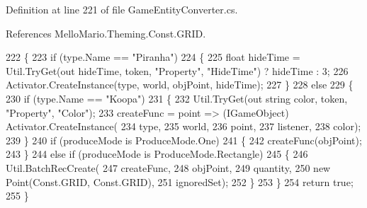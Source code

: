 Definition at line 221 of file Game\+Entity\+Converter.\+cs.



References Mello\+Mario.\+Theming.\+Const.\+G\+R\+ID.


\begin{DoxyCode}
222         \{
223             \textcolor{keywordflow}{if} (type.Name == \textcolor{stringliteral}{"Piranha"})
224             \{
225                 \textcolor{keywordtype}{float} hideTime = Util.TryGet(out hideTime, token, \textcolor{stringliteral}{"Property"}, \textcolor{stringliteral}{"HideTime"}) ? hideTime : 3;
226                 Activator.CreateInstance(type, world, objPoint, hideTime);
227             \}
228             \textcolor{keywordflow}{else}
229             \{
230                 \textcolor{keywordflow}{if} (type.Name == \textcolor{stringliteral}{"Koopa"})
231                 \{
232                     Util.TryGet(out \textcolor{keywordtype}{string} color, token, \textcolor{stringliteral}{"Property"}, \textcolor{stringliteral}{"Color"});
233                     createFunc = point => (IGameObject) Activator.CreateInstance(
234                         type,
235                         world,
236                         point,
237                         listener,
238                         color);
239                 \}
240                 \textcolor{keywordflow}{if} (produceMode is ProduceMode.One)
241                 \{
242                     createFunc(objPoint);
243                 \}
244                 \textcolor{keywordflow}{else} \textcolor{keywordflow}{if} (produceMode is ProduceMode.Rectangle)
245                 \{
246                     Util.BatchRecCreate(
247                         createFunc,
248                         objPoint,
249                         quantity,
250                         \textcolor{keyword}{new} Point(Const.GRID, Const.GRID),
251                         ignoredSet);
252                 \}
253             \}
254             \textcolor{keywordflow}{return} \textcolor{keyword}{true};
255         \}
\end{DoxyCode}
\mbox{\label{classMelloMario_1_1LevelGen_1_1JsonConverters_1_1GameEntityConverter_adeedbe26515a57ca7beda8cbb3a85d86}} 
